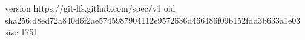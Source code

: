 version https://git-lfs.github.com/spec/v1
oid sha256:d8ed72a840d6f2ae5745987904112e9572636d466486f09b152fdd3b633a1e03
size 1751
